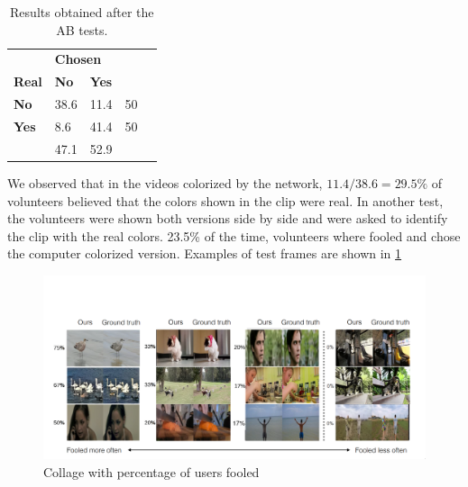 \documentclass[12pt,openright,oneside,a4paper,english]{abntex2}
\begin{document}
\begin{otherlanguage}{english}
\begin{table}[H]
\centering
\begin{tabular}{l|l|l|ll}
\cline{2-3}
                                    & \multicolumn{2}{l|}{\textbf{Chosen}} &                           &  \\ \cline{1-3}
\multicolumn{1}{|l|}{\textbf{Real}} & \textbf{No}      & \textbf{Yes}      &                           &  \\ \cline{1-4}
\multicolumn{1}{|l|}{\textbf{No}}   & 38.6             & 11.4              & \multicolumn{1}{l|}{50} &  \\ \cline{1-4}
\multicolumn{1}{|l|}{\textbf{Yes}}  & 8.6              & 41.4              & \multicolumn{1}{l|}{50} &  \\ \cline{1-4}
                                    & 47.1             & 52.9              &                           &  \\ \cline{2-3}
\end{tabular}
\label{table:ABresults}
\caption{Results obtained after the AB tests.}
\end{table}

We observed that in the videos colorized by the network, \(11.4/38.6 = 29.5\% \) of volunteers  believed that the colors shown in the clip were real. In another test, the volunteers were shown both versions side by side and were asked to identify the clip with the real colors. 23.5\% of the time, volunteers where fooled and chose the computer colorized version. Examples of test frames are shown in \ref{fig:fool_collage}

\begin{figure}[!htb]
\centering
\includegraphics[width=\textwidth+20pt]{fool_collage}
\caption{Collage with percentage of users fooled}
\label{fig:fool_collage}
\end{figure}


\end{otherlanguage}
\end{document}
